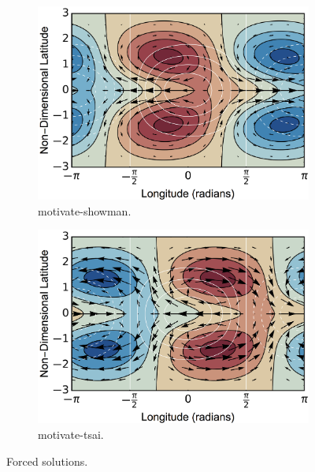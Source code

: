 \begin{figure}
  \centering
  \begin{subfigure}[b]{0.49\textwidth}
    \includegraphics[width=1.0\textwidth]{figures/wave-mean-flow/motivate-showman.png}
    \caption{motivate-showman.}
    \label{fig:motivate-showman}
  \end{subfigure}
  \begin{subfigure}[b]{0.49\textwidth}
    \includegraphics[width=1.0\textwidth]{figures/wave-mean-flow/motivate-tsai.png}
    \caption{motivate-tsai.}
    \label{fig:motivate-tsai}
  \end{subfigure}
  \caption{Forced solutions.}
  \label{fig:motivate-showman-tsai}
\end{figure}



